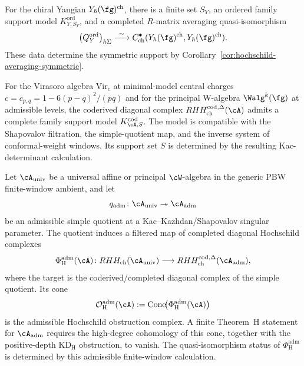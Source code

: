\begin{conjecture}
\label{conj:hochschild-concentration-E1-only}
For the chiral Yangian \(Y_\hbar(\fg)^{\mathrm{ch}}\), there is a
finite set \(S_Y\), an ordered family support model
\(K^{\mathrm{ord}}_{Y,S_Y}\), and a completed \(R\)-matrix averaging
quasi-isomorphism
\[
 \bigl(Q_Y^{\mathrm{ord}}\bigr)_{h\Sigma}
 \xrightarrow{\ \sim\ }
 C^\bullet_{\mathrm{ch}}(Y_\hbar(\fg)^{\mathrm{ch}},
 Y_\hbar(\fg)^{\mathrm{ch}}).
\]
These data determine the symmetric support by
Corollary~\ref{cor:hochschild-averaging-symmetric}.
\end{conjecture}

\begin{conjecture}
\label{conj:hochschild-concentration-class-M-non-generic}
For the Virasoro algebra $\mathrm{Vir}_{c}$ at minimal-model
central charges $c = c_{p,q} = 1 - 6(p-q)^{2}/(pq)$ and for
the principal W-algebra $\Walg^{k}(\fg)$ at admissible
levels, the coderived diagonal complex
\(RHH_{\mathrm{ch}}^{\mathrm{cod},\Delta}(\cA)\) admits a complete
family support model \(K^{\mathrm{cod}}_{\cA,S}\).  The model is
compatible with the Shapovalov filtration, the simple-quotient map,
and the inverse system of conformal-weight windows.  Its support set
\(S\) is determined by the resulting Kac-determinant calculation.
\end{conjecture}

\begin{definition}
\label{def:admissible-hochschild-obstruction-map}
Let $\cA_{\mathrm{univ}}$ be a universal affine or principal
$\cW$-algebra in the generic PBW finite-window ambient, and let
\[
q_{\mathrm{adm}}\colon \cA_{\mathrm{univ}}\twoheadrightarrow
\cA_{\mathrm{adm}}
\]
be an admissible simple quotient at a Kac--Kazhdan/Shapovalov
singular parameter. The quotient induces a filtered map of completed
diagonal Hochschild complexes
\[
\Phi^{\mathrm{adm}}_{\mathrm H}(\cA)\colon
RHH_{\mathrm{ch}}(\cA_{\mathrm{univ}})
\longrightarrow
RHH_{\mathrm{ch}}^{\mathrm{cod},\Delta}(\cA_{\mathrm{adm}}),
\]
where the target is the coderived/completed diagonal complex of the
simple quotient. Its cone
\[
\mathcal O^{\mathrm{adm}}_{\mathrm H}(\cA)
:=
\operatorname{Cone}\!\bigl(
\Phi^{\mathrm{adm}}_{\mathrm H}(\cA)
\bigr)
\]
is the admissible Hochschild obstruction complex. A finite
Theorem~H statement for $\cA_{\mathrm{adm}}$ requires the high-degree
cohomology of this cone, together with the positive-depth
$\mathrm{KD}_{\mathrm H}$ obstruction, to vanish.  The quasi-isomorphism
status of $\Phi^{\mathrm{adm}}_{\mathrm H}$ is determined by this
admissible finite-window calculation.
\end{definition}

